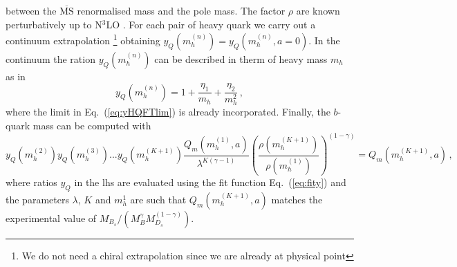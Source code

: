 between the $\overline{\mbox{MS}}$ renormalised mass and the pole mass.
The factor $\rho$ are known perturbatively up to N$^3$LO \cite{Chetyrkin:1999pq}.
For each pair of heavy quark we carry out a continuum extrapolation
\footnote{We do not need a chiral extrapolation since we are already at physical point}
obtaining $y_Q( m^{(n)}_h)=y_Q( m^{(n)}_h,a=0)$.
In the continuum the ration $y_Q( m^{(n)}_h)$ can be described in therm
of heavy mass $ m_h$ as in \cite{ETM:2011zey}
\begin{equation}
  y_Q( m^{(n)}_h) = 1 + \frac{\eta_1}{ m_h}+ \frac{\eta_2}{ m_h^2}\,,
  \label{eq:fity}
\end{equation}
where the limit in Eq.~(\ref{eq:yHQFTlim}) is already incorporated.
Finally, the $b$-quark mass can be computed with
\begin{equation}
  y_Q( m^{(2)}_h)y_Q( m^{(3)}_h)...y_Q( m^{(K+1)}_h)\frac{Q_m( m_h^{(1)},a)}{\lambda^{K(\gamma-1)}}
  \left(\frac{ \rho( m_{h}^{(K+1)})}{\rho( m_{h}^{(1)})}\right)^{(1-\gamma)}=Q_m( m_h^{(K+1)},a)
  \,,
\end{equation}
where  ratios $y_Q$  in the lhs are evaluated using the fit function Eq.~(\ref{eq:fity})
and the parameters $\lambda$, $K$ and $ m_h^1$ are such that $Q_m( m_h^{(K+1)},a)$ matches
the experimental value of $M_{B_s}/(M_{B}^\gamma M_{D_s}^{(1-\gamma)})$.


\endinput
